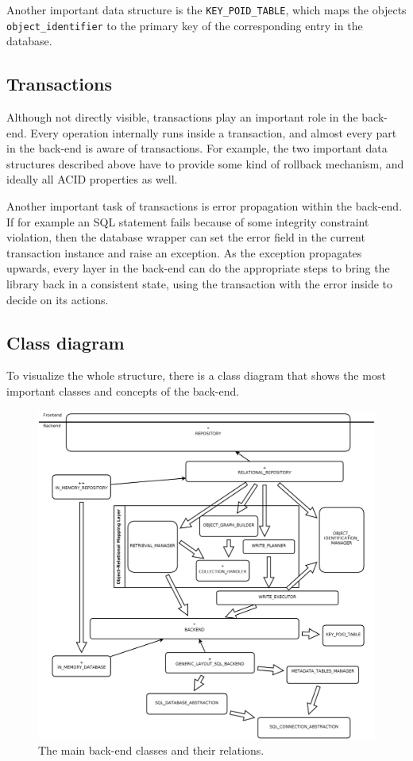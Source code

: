 \documentclass[a4paper,12pt]{report}
\begin{document}
Another important data structure is the \lstinline!KEY_POID_TABLE!, which maps the objects \lstinline!object_identifier! to the primary key of the corresponding entry in the database.

\subsection{Transactions}

Although not directly visible, transactions play an important role in the back-end.
Every operation internally runs inside a transaction, and almost every part in the back-end is aware of transactions.
For example, the two important data structures described above have to provide some kind of rollback mechanism, and ideally all ACID %
properties as well.

Another important task of transactions is error propagation within the back-end.
If for example an SQL statement fails because of some integrity constraint violation, then the database wrapper can set the error field in the current transaction instance and raise an exception.
As the exception propagates upwards, every layer in the back-end can do the appropriate steps to bring the library back in a consistent state, using the transaction with the error inside to decide on its actions.

\subsection{Class diagram}

To visualize the whole structure, there is a class diagram that shows the most important classes and concepts of the back-end.

\begin{figure} [h]
\centering
\includegraphics[trim= 0mm -10mm 0mm -10mm,clip, width = 13cm] {../includes/backend.png}
\caption{The main back-end classes and their relations.}
\label{fig:backend_classes}
\end{figure}
\end{document}
